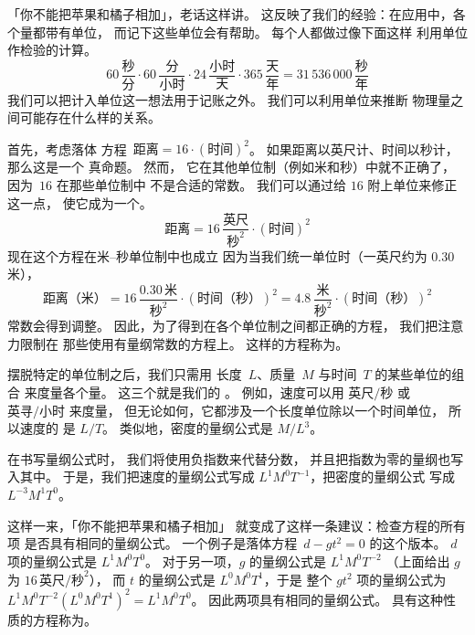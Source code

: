 「你不能把苹果和橘子相加」，老话这样讲。
这反映了我们的经验：在应用中，各个量都带有单位，
而记下这些单位会有帮助。
每个人都做过像下面这样
利用单位作检验的计算。
\begin{equation*}
  60\,\frac{\text{秒}}{\text{分}}
  \cdot 60\,\frac{\text{分}}{\text{小时}}
  \cdot 24\,\frac{\text{小时}}{\text{天}}
  \cdot 365\,\frac{\text{天}}{\text{年}}
  = 31\,536\,000\,\frac{\text{秒}}{\text{年}}
\end{equation*}
我们可以把计入单位这一想法用于记账之外。
我们可以利用单位来推断
物理量之间可能存在什么样的关系。

首先，考虑落体
方程~$\text{距离}=16\cdot(\text{时间})^2$。
如果距离以英尺计、时间以秒计，那么这是一个
真命题。
然而，
它在其他单位制（例如米和秒）中就不正确了，
因为~$16$ 在那些单位制中
不是合适的常数。
我们可以通过给 $16$ 附上单位来修正这一点，
使它成为一个。
\begin{equation*}
  \text{距离}=16\,\frac{\text{英尺}}{\text{秒}^2}\cdot (\text{时间})^2
\end{equation*}  
现在这个方程在米–秒单位制中也成立   
因为当我们统一单位时（一英尺约为 $0.30$ 米），
\begin{equation*}
  \text{距离（米）}=16\,\frac{0.30\,\text{米}}{\text{秒}^2}
                    \cdot (\text{时间（秒）})^2
                   =4.8\,\frac{\text{米}}{\text{秒}^2}
                    \cdot (\text{时间（秒）})^2
\end{equation*}
常数会得到调整。
因此，为了得到在各个单位制之间都正确的方程，
我们把注意力限制在
那些使用有量纲常数的方程上。
这样的方程称为。

摆脱特定的单位制之后，我们只需用
长度~$L$、质量~$M$ 与时间~$T$ 的某些单位的组合
来度量各个量。
这三个就是我们的
。
例如，速度可以用
$\text{英尺}/\text{秒}$
或 $\text{英寻}/\text{小时}$ 来度量，
但无论如何，它都涉及一个长度单位除以一个时间单位，
所以速度的 
是 $L/T$。
类似地，密度的量纲公式是 $M/L^3$。

在书写量纲公式时，
我们将使用负指数来代替分数，
并且把指数为零的量纲也写入其中。
于是，我们把速度的量纲公式写成
$L^1M^0T^{-1}$，把密度的量纲公式
写成 $L^{-3}M^1T^0$。

这样一来，「你不能把苹果和橘子相加」
就变成了这样一条建议：检查方程的所有项
是否具有相同的量纲公式。
一个例子是落体方程~$d-gt^2=0$ 的这个版本。
$d$ 项的量纲公式是 $L^1M^0T^0$。
对于另一项，$g$ 的量纲公式是 $L^1M^0T^{-2}$ 
（上面给出 $g$ 为 $16\,\text{英尺}/\text{秒}^2$），
而 $t$ 的量纲公式是 $L^0M^0T^1$，于是  
整个 $gt^2$ 项的量纲公式为
$L^1M^0T^{-2}(L^0M^0T^1)^2=L^1M^0T^0$。
因此两项具有相同的量纲公式。
具有这种性质的方程称为。

